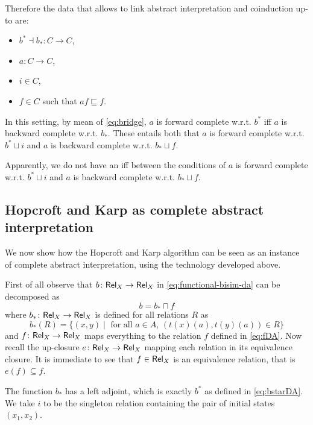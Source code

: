 \documentclass{llncs}
\begin{document}
Therefore the data that allows to link abstract interpretation and coinduction up-to are:
\begin{itemize}
\item $b^*\dashv b_* \colon C\to C$,
\item $a\colon C \to C$,
\item $i\in C$,
\item $f\in C$ such that $af \sqsubseteq f$.
\end{itemize}
In this setting, by mean of \eqref{eq:bridge}, $a$ is forward complete w.r.t. $b^*$ iff  $a$ is backward complete w.r.t. $b_*$. These entails both that 
$a$ is forward complete w.r.t. $b^*\sqcup i $ and $a$ is backward complete w.r.t. $b_* \sqcup f$.

\begin{remark}
Apparently, we do not have an iff between the conditions of $a$ is forward complete w.r.t. $b^*\sqcup i $ and $a$ is backward complete w.r.t. $b_* \sqcup f$.
\end{remark}





\subsection{Hopcroft and Karp as complete abstract interpretation}
We now show how the Hopcroft and Karp algorithm can be seen as an instance of complete abstract interpretation, using the technology developed above.

First of all observe that $b\colon \mathsf{Rel}_X\to \mathsf{Rel}_X$ in \eqref{eq:functional-bisim-da} can be decomposed as
$$b = b_* \sqcap f$$
where $b_* \colon \mathsf{Rel}_X\to  \mathsf{Rel}_X$ is defined for all relations $R$ as
\begin{equation}
b_*(R) =\{(x,y) \mid \text{ for all } a\in A, \, (t(x)(a), t(y)(a))\in R  \}
\end{equation}
and $f\colon \mathsf{Rel}_X \to \mathsf{Rel}_X$ maps everything to the relation $f$ defined in \eqref{eq:fDA}.
Now recall the up-closure $e\colon \mathsf{Rel}_X \to \mathsf{Rel}_X$ mapping each relation in its equivalence closure. It is immediate to see that $f\in \mathsf{Rel}_X$ is an equivalence relation, that is $e(f)\subseteq f$.

The function $b_*$ has a left adjoint, which is exactly $b^*$ as defined in \eqref{eq:bstarDA}. We take $i$ to be the singleton relation containing the pair of initial states $(x_1,x_2)$.
\end{document}
